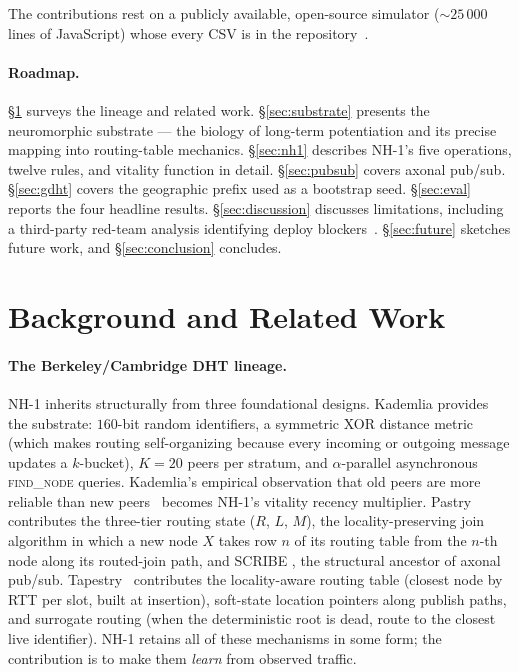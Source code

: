 \documentclass[conference]{IEEEtran}
\newcommand{\nhone}{NH-1\xspace}
\begin{document}
\noindent
The contributions rest on a publicly available, open-source simulator
($\sim\!25\,000$ lines of JavaScript) whose every CSV is in the
repository~\cite{dhtsim2026}.

\paragraph{Roadmap.}
\S\ref{sec:related} surveys the lineage and related work. \S\ref{sec:substrate}
presents the neuromorphic substrate --- the biology of long-term
potentiation and its precise mapping into routing-table mechanics.
\S\ref{sec:nh1} describes \nhone's five operations, twelve rules, and
vitality function in detail. \S\ref{sec:pubsub} covers axonal pub/sub.
\S\ref{sec:gdht} covers the geographic prefix used as a bootstrap seed.
\S\ref{sec:eval} reports the four headline results. \S\ref{sec:discussion}
discusses limitations, including a third-party red-team analysis identifying
deploy blockers~\cite{nh1redteam2026}. \S\ref{sec:future} sketches future
work, and \S\ref{sec:conclusion} concludes.

\section{Background and Related Work}
\label{sec:related}

\paragraph{The Berkeley/Cambridge DHT lineage.}
\nhone inherits structurally from three foundational designs. Kademlia
\cite{maymounkov2002kademlia} provides the substrate: $160$-bit random
identifiers, a symmetric XOR distance metric (which makes routing
self-organizing because every incoming or outgoing message updates a
$k$-bucket), $K=20$ peers per stratum, and $\alpha$-parallel asynchronous
\textsc{find\_node} queries. Kademlia's empirical observation that old
peers are more reliable than new peers~\cite{saroiu2003measurement}
becomes \nhone's vitality recency multiplier. Pastry~\cite{rowstron2001pastry}
contributes
the three-tier routing state ($R$, $L$, $M$), the locality-preserving
join algorithm in which a new node $X$ takes row $n$ of its routing
table from the $n$-th node along its routed-join path, and SCRIBE
\cite{castro2002scribe}, the structural ancestor of axonal pub/sub.
Tapestry~\cite{zhao2004tapestry} contributes the locality-aware
routing table (closest node by RTT per slot, built at insertion),
soft-state location pointers along publish paths, and surrogate
routing (when the deterministic root is dead, route to the closest
live identifier). \nhone retains all of these mechanisms in some form;
the contribution is to make them \emph{learn} from observed traffic.
\end{document}
